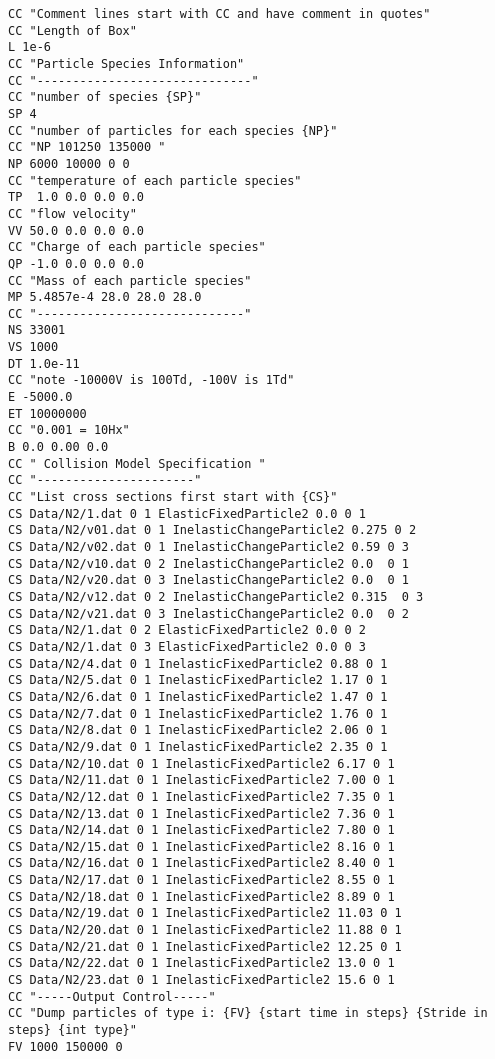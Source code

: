 \documentclass[letterpaper,10pt,english,openany,oneside]{sphinxmanual}
\begin{document}
\begin{lstlisting}
CC "Comment lines start with CC and have comment in quotes"
CC "Length of Box"
L 1e-6
CC "Particle Species Information"
CC "------------------------------"
CC "number of species {SP}"
SP 4
CC "number of particles for each species {NP}"
CC "NP 101250 135000 "
NP 6000 10000 0 0 
CC "temperature of each particle species"
TP  1.0 0.0 0.0 0.0
CC "flow velocity"
VV 50.0 0.0 0.0 0.0
CC "Charge of each particle species"
QP -1.0 0.0 0.0 0.0
CC "Mass of each particle species"
MP 5.4857e-4 28.0 28.0 28.0
CC "-----------------------------"
NS 33001
VS 1000
DT 1.0e-11
CC "note -10000V is 100Td, -100V is 1Td"
E -5000.0
ET 10000000
CC "0.001 = 10Hx"
B 0.0 0.00 0.0
CC " Collision Model Specification "
CC "----------------------"
CC "List cross sections first start with {CS}"
CS Data/N2/1.dat 0 1 ElasticFixedParticle2 0.0 0 1
CS Data/N2/v01.dat 0 1 InelasticChangeParticle2 0.275 0 2
CS Data/N2/v02.dat 0 1 InelasticChangeParticle2 0.59 0 3
CS Data/N2/v10.dat 0 2 InelasticChangeParticle2 0.0  0 1 
CS Data/N2/v20.dat 0 3 InelasticChangeParticle2 0.0  0 1
CS Data/N2/v12.dat 0 2 InelasticChangeParticle2 0.315  0 3
CS Data/N2/v21.dat 0 3 InelasticChangeParticle2 0.0  0 2 
CS Data/N2/1.dat 0 2 ElasticFixedParticle2 0.0 0 2
CS Data/N2/1.dat 0 3 ElasticFixedParticle2 0.0 0 3
CS Data/N2/4.dat 0 1 InelasticFixedParticle2 0.88 0 1
CS Data/N2/5.dat 0 1 InelasticFixedParticle2 1.17 0 1
CS Data/N2/6.dat 0 1 InelasticFixedParticle2 1.47 0 1
CS Data/N2/7.dat 0 1 InelasticFixedParticle2 1.76 0 1
CS Data/N2/8.dat 0 1 InelasticFixedParticle2 2.06 0 1
CS Data/N2/9.dat 0 1 InelasticFixedParticle2 2.35 0 1
CS Data/N2/10.dat 0 1 InelasticFixedParticle2 6.17 0 1
CS Data/N2/11.dat 0 1 InelasticFixedParticle2 7.00 0 1
CS Data/N2/12.dat 0 1 InelasticFixedParticle2 7.35 0 1
CS Data/N2/13.dat 0 1 InelasticFixedParticle2 7.36 0 1
CS Data/N2/14.dat 0 1 InelasticFixedParticle2 7.80 0 1
CS Data/N2/15.dat 0 1 InelasticFixedParticle2 8.16 0 1
CS Data/N2/16.dat 0 1 InelasticFixedParticle2 8.40 0 1
CS Data/N2/17.dat 0 1 InelasticFixedParticle2 8.55 0 1
CS Data/N2/18.dat 0 1 InelasticFixedParticle2 8.89 0 1
CS Data/N2/19.dat 0 1 InelasticFixedParticle2 11.03 0 1
CS Data/N2/20.dat 0 1 InelasticFixedParticle2 11.88 0 1
CS Data/N2/21.dat 0 1 InelasticFixedParticle2 12.25 0 1
CS Data/N2/22.dat 0 1 InelasticFixedParticle2 13.0 0 1
CS Data/N2/23.dat 0 1 InelasticFixedParticle2 15.6 0 1
CC "-----Output Control-----"
CC "Dump particles of type i: {FV} {start time in steps} {Stride in steps} {int type}"
FV 1000 150000 0
\end{lstlisting}
\end{document}
